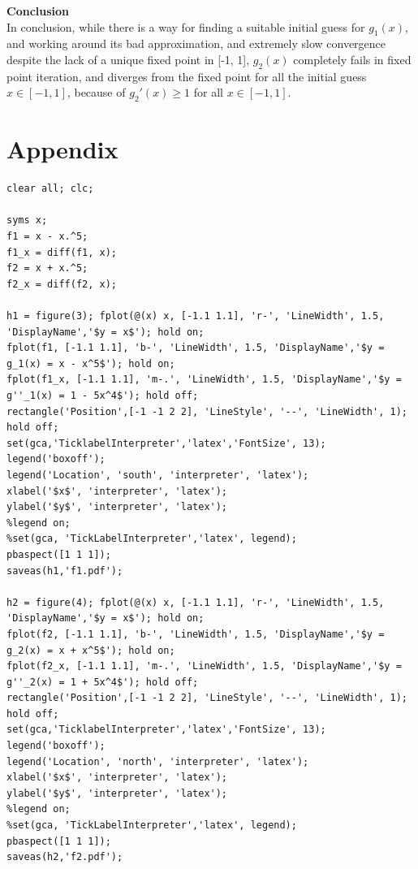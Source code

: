 \documentclass[11pt]{article} %
\begin{document}
\textbf{Conclusion}\\
In conclusion, while there is a way for finding a suitable initial guess for $g_1(x)$, and working around its bad approximation, and extremely slow convergence despite the lack of a unique fixed point in [-1, 1], $g_2(x)$ completely fails in fixed point iteration, and diverges from the fixed point for all the initial guess $x \in [-1, 1]$, because of $g_2'(x) \geq 1$ for all $x \in [-1, 1]$.





\clearpage
\newpage

\section*{\textbf{\huge{Appendix}}}\label{appen}

\begin{lstlisting}[caption={\textit{Existence}, and \textit{uniqueness} check for fixed point (\textit{func_check.m}).}]
clear all; clc;

syms x;
f1 = x - x.^5;
f1_x = diff(f1, x);
f2 = x + x.^5;
f2_x = diff(f2, x);

h1 = figure(3); fplot(@(x) x, [-1.1 1.1], 'r-', 'LineWidth', 1.5, 'DisplayName','$y = x$'); hold on; 
fplot(f1, [-1.1 1.1], 'b-', 'LineWidth', 1.5, 'DisplayName','$y = g_1(x) = x - x^5$'); hold on; 
fplot(f1_x, [-1.1 1.1], 'm-.', 'LineWidth', 1.5, 'DisplayName','$y = g''_1(x) = 1 - 5x^4$'); hold off;
rectangle('Position',[-1 -1 2 2], 'LineStyle', '--', 'LineWidth', 1); hold off;
set(gca,'TicklabelInterpreter','latex','FontSize', 13);
legend('boxoff');
legend('Location', 'south', 'interpreter', 'latex');
xlabel('$x$', 'interpreter', 'latex');
ylabel('$y$', 'interpreter', 'latex');
%legend on;
%set(gca, 'TickLabelInterpreter','latex', legend);
pbaspect([1 1 1]);
saveas(h1,'f1.pdf');

h2 = figure(4); fplot(@(x) x, [-1.1 1.1], 'r-', 'LineWidth', 1.5, 'DisplayName','$y = x$'); hold on; 
fplot(f2, [-1.1 1.1], 'b-', 'LineWidth', 1.5, 'DisplayName','$y = g_2(x) = x + x^5$'); hold on; 
fplot(f2_x, [-1.1 1.1], 'm-.', 'LineWidth', 1.5, 'DisplayName','$y = g''_2(x) = 1 + 5x^4$'); hold off;
rectangle('Position',[-1 -1 2 2], 'LineStyle', '--', 'LineWidth', 1); hold off;
set(gca,'TicklabelInterpreter','latex','FontSize', 13);
legend('boxoff');
legend('Location', 'north', 'interpreter', 'latex');
xlabel('$x$', 'interpreter', 'latex');
ylabel('$y$', 'interpreter', 'latex');
%legend on;
%set(gca, 'TickLabelInterpreter','latex', legend);
pbaspect([1 1 1]);
saveas(h2,'f2.pdf');
\end{lstlisting}
\end{document}
